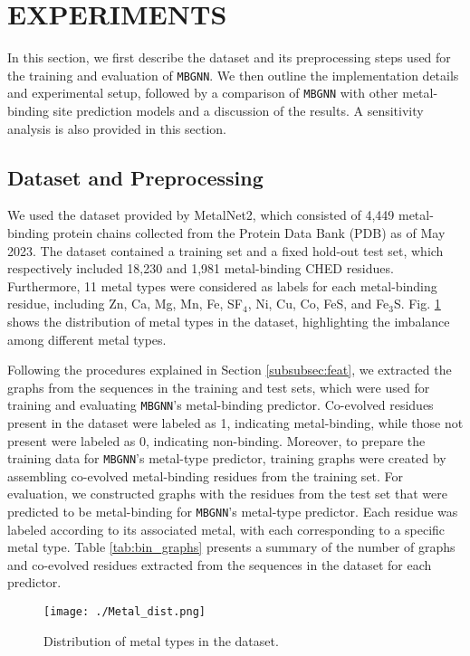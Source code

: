 \documentclass[letterpaper, 10 pt, conference]{ieeeconf}
\begin{document}
\section{EXPERIMENTS}
In this section, we first describe the dataset and its preprocessing steps used for the training and evaluation of \texttt{MBGNN}. We then outline the implementation details and experimental setup, followed by a comparison of \texttt{MBGNN} with other metal-binding site prediction models and a discussion of the results. A sensitivity analysis is also provided in this section.
\subsection{Dataset and Preprocessing} 
\label{subsec:dataset}
We used the dataset provided by MetalNet2, which consisted of 4,449 metal-binding protein chains collected from the Protein Data Bank (PDB) as of May 2023. The dataset contained a training set and a fixed hold-out test set, which respectively included 18,230 and 1,981 metal-binding CHED residues. Furthermore, 11 metal types were considered as labels for each metal-binding residue, including Zn, Ca, Mg, Mn, Fe, SF$_4$, Ni, Cu, Co, FeS, and Fe$_3$S. Fig. \ref{fig:metal_dist} shows the distribution of metal types in the dataset, highlighting the imbalance among different metal types.

Following the procedures explained in Section \ref{subsubsec:feat}, we extracted the graphs from the sequences in the training and test sets, which were used for training and evaluating \texttt{MBGNN}'s metal-binding predictor. Co-evolved residues present in the dataset were labeled as 1, indicating metal-binding, while those not present were labeled as 0, indicating non-binding. Moreover, to prepare the training data for \texttt{MBGNN}'s metal-type predictor, training graphs were created by assembling co-evolved metal-binding residues from the training set. For evaluation, we constructed graphs with the residues from the test set that were predicted to be metal-binding for \texttt{MBGNN}'s metal-type predictor. Each residue was labeled according to its associated metal, with each corresponding to a specific metal type. Table \ref{tab:bin_graphs} presents a summary of the number of graphs and co-evolved residues extracted from the sequences in the dataset for each predictor.


\begin{figure}[!t]
    \centering
    \texttt{[image: ./Metal\_dist.png]}
    \caption{Distribution of metal types in the dataset.}
    \label{fig:metal_dist}
\end{figure}
\end{document}
